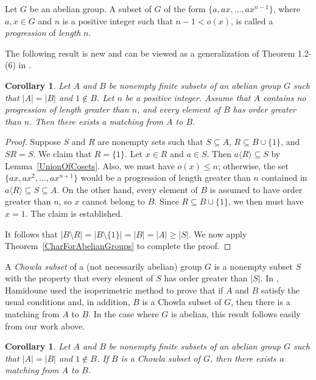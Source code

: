 \documentclass[11pt]{amsart}
\newtheorem{corollary}[theorem]{Corollary}
\theoremstyle{definition}
\theoremstyle{remark}
\begin{document}
Let \( G \) be an abelian group. A subset of \( G \) of the form \( \{ a, ax, \ldots , ax^{n-1} \} \), where \( a, x \in G \) and \( n \) is a positive integer such that \( n -1 < o(x) \), is called a {\em progression} of {\em length} \( n \). 

The following result is new and can be viewed as a generalization of Theorem 1.2-(6) in \cite{Aliabadi 2}.


\begin{corollary} \label{ProgAndOrder}
Let \( A \) and \( B \) be nonempty finite subsets of an abelian group \( G \) such that \( |A| = |B| \) and \( 1 \notin B \). Let \( n \) be a positive integer. Assume that \( A \) contains no progression of length greater than \( n \), and every element of \( B \) has order greater than \( n \).  Then there exists a matching from \( A \) to \( B \). 
\end{corollary}

\begin{proof}
Suppose \( S \) and \( R \) are nonempty sets such that \( S \subseteq A \), \( R \subseteq B \cup \{ 1 \} \), and \( SR = S \).  We claim that \( R = \{ 1 \} \).  Let \( x \in R \) and \( a \in S \). Then \( a \langle R \rangle \subseteq  S \) by Lemma~\ref{UnionOfCosets}. Also, we must have \( o(x) \leq n \); otherwise, the set \( \{ ax, ax^2, \ldots , ax^{n + 1} \} \) would be a progression of length greater than \( n \) contained in \( a \langle R \rangle \subseteq  S \subseteq A \). On the other hand, every element of \( B \) is assumed to have order greater than \( n \), so \( x \) cannot belong to  \( B \). Since \( R \subseteq B \cup \{ 1 \} \), we then must have \( x = 1 \). The claim is established.

It follows that \( |B \setminus R | = |B \setminus \{ 1 \}| = |B| = |A| \geq |S| \).  We now apply Theorem~\ref{CharForAbelianGroups} to complete the proof. \end{proof}


A {\em Chowla subset} of a (not necessarily abelian) group \( G \) is a nonempty subset \( S \) with the property that every element of \( S \) has order greater than \( |S| \). In \cite{Hamidoune}, Hamidoune used the isoperimetric method to prove that if \( A \) and \( B \) satisfy the usual conditions and, in addition, \( B \) is a Chowla subset of \( G \), then there is a matching from \( A \) to \( B \).  In the case where \( G \) is abelian, this result follows easily from our work above.


\begin{corollary}\label{Chowla set}
Let \( A \) and \( B \) be nonempty finite subsets of an abelian group \( G \) such that \( |A| = |B| \) and \( 1 \notin B \). If \( B \) is a Chowla subset of \( G \), then there exists a matching from \( A \) to \( B \).
\end{corollary}
\end{document}
